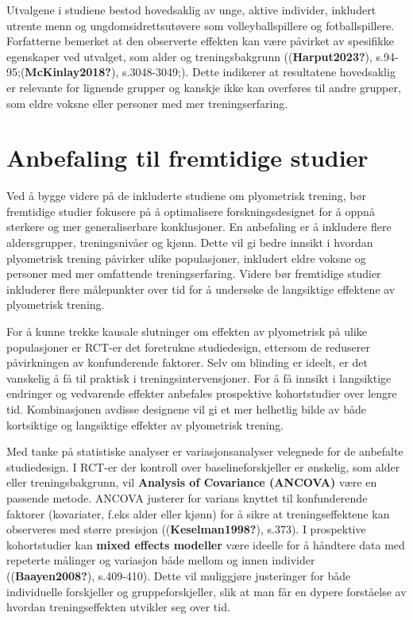 \documentclass[
  letterpaper,
  DIV=11,
  numbers=noendperiod]{scrreprt}
\begin{document}
Utvalgene i studiene bestod hovedsaklig av unge, aktive individer,
inkludert utrente menn og ungdomsidrettsutøvere som volleyballspillere
og fotballspillere. Forfatterne bemerket at den observerte effekten kan
være påvirket av spesifikke egenskaper ved utvalget, som alder og
treningsbakgrunn ((\textbf{Harput2023?}),
s.94-95;(\textbf{McKinlay2018?}), s.3048-3049;). Dette indikerer at
resultatene hovedsaklig er relevante for lignende grupper og kanskje
ikke kan overføres til andre grupper, som eldre voksne eller personer
med mer treningserfaring.


\chapter{Anbefaling til fremtidige
studier}\label{anbefaling-til-fremtidige-studier}

Ved å bygge videre på de inkluderte studiene om plyometrisk trening, bør
fremtidige studier fokusere på å optimalisere forskningsdesignet for å
oppnå sterkere og mer generaliserbare konklusjoner. En anbefaling er å
inkludere flere aldersgrupper, treningsnivåer og kjønn. Dette vil gi
bedre innsikt i hvordan plyometrisk trening påvirker ulike populasjoner,
inkludert eldre voksne og personer med mer omfattende treningserfaring.
Videre bør fremtidige studier inkluderer flere målepunkter over tid for
å undersøke de langsiktige effektene av plyometrisk trening.

For å kunne trekke kausale slutninger om effekten av plyometrisk på
ulike populasjoner er RCT-er det foretrukne studiedesign, ettersom de
reduserer påvirkningen av konfunderende faktorer. Selv om blinding er
ideelt, er det vanskelig å få til praktisk i treningsintervensjoner. For
å få innsikt i langsiktige endringer og vedvarende effekter anbefales
prospektive kohortstudier over lengre tid. Kombinasjonen avdisse
designene vil gi et mer helhetlig bilde av både kortsiktige og
langsiktige effekter av plyometrisk trening.

Med tanke på statistiske analyser er variasjonsanalyser velegnede for de
anbefalte studiedesign. I RCT-er der kontroll over baselineforskjeller
er ønskelig, som alder eller treningsbakgrunn, vil \textbf{Analysis of
Covariance (ANCOVA)} være en passende metode. ANCOVA justerer for
varians knyttet til konfunderende faktorer (kovariater, f.eks alder
eller kjønn) for å sikre at treningseffektene kan observeres med større
presisjon ((\textbf{Keselman1998?}), s.373). I prospektive kohortstudier
kan \textbf{mixed effects modeller} være ideelle for å håndtere data med
repeterte målinger og variasjon både mellom og innen individer
((\textbf{Baayen2008?}), s.409-410). Dette vil muliggjøre justeringer
for både individuelle forskjeller og gruppeforskjeller, slik at man får
en dypere forståelse av hvordan treningseffekten utvikler seg over tid.
\end{document}

